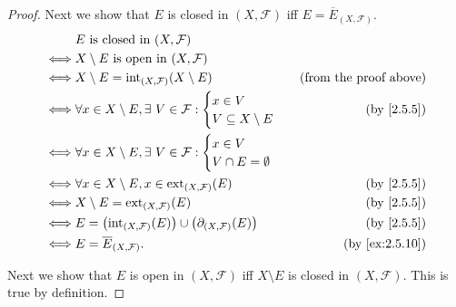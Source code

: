 \begin{proof}
  Next we show that \(E\) is closed in \((X, \mathcal{F})\) iff \(E = \overline{E}_{(X, \mathcal{F})}\).
  \begin{align*}
         & E \text{ is closed in } (X, \mathcal{F})                                                                                     \\
    \iff & X \setminus E \text{ is open in } (X, \mathcal{F})                                                                           \\
    \iff & X \setminus E = \text{int}_{(X, \mathcal{F})}(X \setminus E)                                 & \text{(from the proof above)} \\
    \iff & \forall x \in X \setminus E, \exists\ V \in \mathcal{F} : \begin{cases}
                                                                       x \in V \\
                                                                       V \subseteq X \setminus E
                                                                     \end{cases}                      & \text{(by \cref{2.5.5})}        \\
    \iff & \forall x \in X \setminus E, \exists\ V \in \mathcal{F} : \begin{cases}
                                                                       x \in V \\
                                                                       V \cap E = \emptyset
                                                                     \end{cases}                                                \\
    \iff & \forall x \in X \setminus E, x \in \text{ext}_{(X, \mathcal{F})}(E)                          & \text{(by \cref{2.5.5})}      \\
    \iff & X \setminus E = \text{ext}_{(X, \mathcal{F})}(E)                                             & \text{(by \cref{2.5.5})}      \\
    \iff & E = \big(\text{int}_{(X, \mathcal{F})}(E)\big) \cup \big(\partial_{(X, \mathcal{F})}(E)\big) & \text{(by \cref{2.5.5})}      \\
    \iff & E = \overline{E}_{(X, \mathcal{F})}.                                                         & \text{(by \cref{ex:2.5.10})}
  \end{align*}

  Next we show that \(E\) is open in \((X, \mathcal{F})\) iff \(X \setminus E\) is closed in \((X, \mathcal{F})\).
  This is true by definition.


\end{proof}
